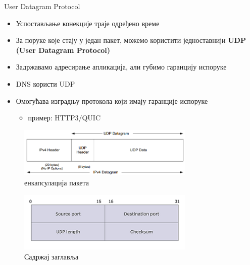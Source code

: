 \documentclass{beamer}
\begin{document}
    \begin{frame}[allowframebreaks]{User Datagram Protocol}
        \begin{itemize}
            \item Успостављање конекције траје одређено време
            \item За поруке које стају у један пакет, можемо користити једноставнији \textbf{UDP (User Datagram Protocol)}
            \item Задржавамо адресирање апликација, али губимо гаранцију испоруке
            \item DNS користи UDP
            \item Омогућава изградњу протокола који имају гаранције испоруке
            \begin{itemize}
                \item пример: HTTP3/QUIC
            \end{itemize}
        \end{itemize}
    
        \framebreak
        
        \begin{figure}
            \centering
            \includegraphics[width=0.75\textwidth]{images/udp_enc.png}
            \caption{енкапсулација пакета}
            \label{fig:udp_enc}
        \end{figure}
        
        \framebreak
        
        \begin{figure}
            \centering
            \includegraphics[width=0.75\textwidth]{images/udp_header.png}
            \caption{Садржај заглавља}
            \label{fig:udp_header}
        \end{figure}
    \end{frame}
    
\end{document}
